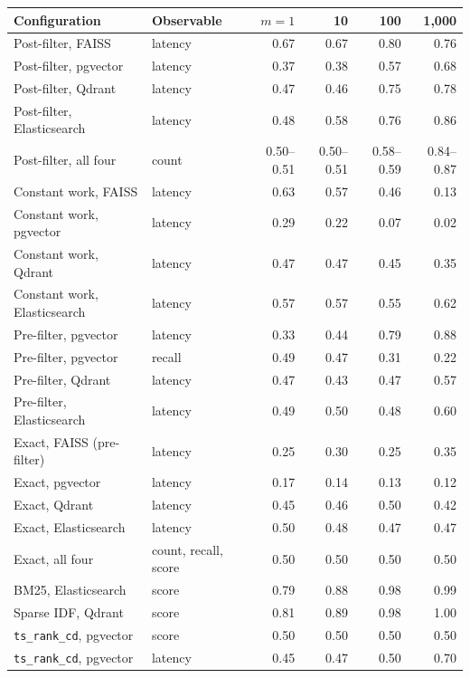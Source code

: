 \begin{table}[tbp]
\centering
\small
\begin{tabular}{@{}llrrrr@{}}
\toprule
Configuration & Observable & $m = 1$ & 10 & 100 & 1,000 \\
\midrule
Post-filter, FAISS & latency & 0.67 & 0.67 & 0.80 & 0.76 \\
Post-filter, pgvector & latency & 0.37 & 0.38 & 0.57 & 0.68 \\
Post-filter, Qdrant & latency & 0.47 & 0.46 & 0.75 & 0.78 \\
Post-filter, Elasticsearch & latency & 0.48 & 0.58 & 0.76 & 0.86 \\
Post-filter, all four & count & 0.50--0.51 & 0.50--0.51 & 0.58--0.59 & 0.84--0.87 \\
\midrule
Constant work, FAISS & latency & 0.63 & 0.57 & 0.46 & 0.13 \\
Constant work, pgvector & latency & 0.29 & 0.22 & 0.07 & 0.02 \\
Constant work, Qdrant & latency & 0.47 & 0.47 & 0.45 & 0.35 \\
Constant work, Elasticsearch & latency & 0.57 & 0.57 & 0.55 & 0.62 \\
\midrule
Pre-filter, pgvector & latency & 0.33 & 0.44 & 0.79 & 0.88 \\
Pre-filter, pgvector & recall & 0.49 & 0.47 & 0.31 & 0.22 \\
Pre-filter, Qdrant & latency & 0.47 & 0.43 & 0.47 & 0.57 \\
Pre-filter, Elasticsearch & latency & 0.49 & 0.50 & 0.48 & 0.60 \\
\midrule
Exact, FAISS (pre-filter) & latency & 0.25 & 0.30 & 0.25 & 0.35 \\
Exact, pgvector & latency & 0.17 & 0.14 & 0.13 & 0.12 \\
Exact, Qdrant & latency & 0.45 & 0.46 & 0.50 & 0.42 \\
Exact, Elasticsearch & latency & 0.50 & 0.48 & 0.47 & 0.47 \\
Exact, all four & count, recall, score & 0.50 & 0.50 & 0.50 & 0.50 \\
\midrule
BM25, Elasticsearch & score & 0.79 & 0.88 & 0.98 & 0.99 \\
Sparse IDF, Qdrant & score & 0.81 & 0.89 & 0.98 & 1.00 \\
\texttt{ts\_rank\_cd}, pgvector & score & 0.50 & 0.50 & 0.50 & 0.50 \\
\texttt{ts\_rank\_cd}, pgvector & latency & 0.45 & 0.47 & 0.50 & 0.70 \\
\bottomrule

\end{tabular}
\end{table}
